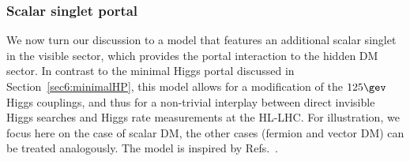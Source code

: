 \documentclass[../report.tex]{subfiles}
\begin{document}
\subsubsection{Scalar singlet portal}
\label{sec6:singletHP}
We now turn our discussion to a model that features an additional scalar singlet in the visible sector, which provides the portal interaction to the hidden DM sector. In contrast to the minimal Higgs portal discussed in Section~\ref{sec6:minimalHP}, this model allows for a modification of the $125\gev$ Higgs couplings, and thus for a non-trivial interplay between direct invisible Higgs searches and Higgs rate measurements at the HL-LHC. For illustration, we focus here on the case of scalar DM, the other cases (fermion and vector DM) can be treated analogously. The model is inspired by Refs.~\cite{Englert:2011yb,Robens:2015gla}.
\end{document}
